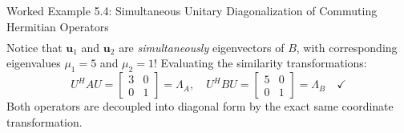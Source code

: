 \begin{examplebox}{Worked Example 5.4: Simultaneous Unitary Diagonalization of Commuting Hermitian Operators}
\begin{align*}
\end{align*}
Notice that $\mathbf{u}_1$ and $\mathbf{u}_2$ are \emph{simultaneously} eigenvectors of $B$, with corresponding eigenvalues $\mu_1 = 5$ and $\mu_2 = 1$!
Evaluating the similarity transformations:
\begin{equation*}
U^H A U = \begin{bmatrix} 3 & 0 \\ 0 & 1 \end{bmatrix} = \Lambda_A, \quad U^H B U = \begin{bmatrix} 5 & 0 \\ 0 & 1 \end{bmatrix} = \Lambda_B \quad \checkmark
\end{equation*}
Both operators are decoupled into diagonal form by the exact same coordinate transformation.
\end{examplebox}

